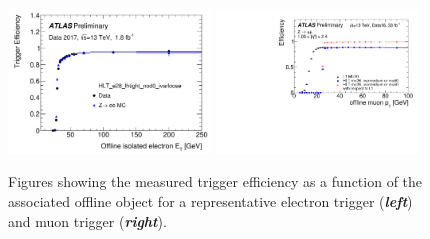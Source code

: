 \begin{figure}[!htb]
    \begin{center}
        \includegraphics[width=0.48\textwidth]{figures/common_ana/trig/egam_trig_example} 
        \includegraphics[width=0.48\textwidth]{figures/common_ana/trig/muon_trig_example} 
        \caption{
            Figures showing the measured trigger efficiency as a function of the associated
            offline object for a representative electron trigger (\textbf{\textit{left}})
            and muon trigger (\textbf{\textit{right}}).
        }
        \label{fig:trig_example}
    \end{center}
\end{figure}



